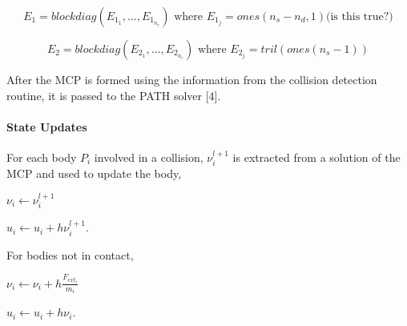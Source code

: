 \documentclass{article}
\begin{document}
\begin{equation}
E_1 = blockdiag(E_{1_1}, \dots , E_{1_{n_c}}) \text{ where } E_{1_j} = ones(n_s - n_d,1) \text{(is this true?)}
\nonumber
\end{equation}

\begin{equation}
E_2 = blockdiag(E_{2_1}, \dots , E_{2_{n_c}}) \text{ where } E_{2_j} = tril(ones(n_s - 1))
\nonumber
\end{equation}

After the MCP is formed using the information from the collision detection routine, it is passed to the PATH solver [4].  

\paragraph{State Updates}
For each body $P_{i}$ involved in a collision, $\nu_{i}^{l+1}$ is extracted from a solution of the MCP and used to update the body, 
\begin{center}
$
\nu_{i} \gets \nu_{i}^{l+1}    \nonumber
$ 

$
u_{i} \gets u_{i} + h \nu_{i}^{l+1}   \nonumber
$. 
\end{center}
For bodies not in contact, 
\begin{center}
$
\nu_{i} \gets \nu_{i} + h \frac{F_{ext_i}}{m_{i}}
$

$
u_{i} \gets u_{i} + h \nu_{i}
$.
\end{center}
\end{document}
